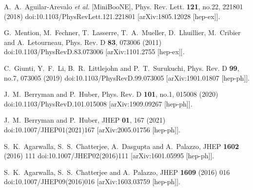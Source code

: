 \begin{thebibliography}{00}
A.~A.~Aguilar-Arevalo \textit{et al.} [MiniBooNE],
Phys. Rev. Lett. \textbf{121}, no.22, 221801 (2018)
doi:10.1103/PhysRevLett.121.221801
[arXiv:1805.12028 [hep-ex]].

G.~Mention, M.~Fechner, T.~Lasserre, T.~A.~Mueller, D.~Lhuillier, M.~Cribier and A.~Letourneau,
Phys. Rev. D \textbf{83}, 073006 (2011)
doi:10.1103/PhysRevD.83.073006
[arXiv:1101.2755 [hep-ex]].

C.~Giunti, Y.~F.~Li, B.~R.~Littlejohn and P.~T.~Surukuchi,
Phys. Rev. D \textbf{99}, no.7, 073005 (2019)
doi:10.1103/PhysRevD.99.073005
[arXiv:1901.01807 [hep-ph]].

J.~M.~Berryman and P.~Huber,
Phys. Rev. D \textbf{101}, no.1, 015008 (2020)
doi:10.1103/PhysRevD.101.015008
[arXiv:1909.09267 [hep-ph]].

J.~M.~Berryman and P.~Huber,
JHEP \textbf{01}, 167 (2021)
doi:10.1007/JHEP01(2021)167
[arXiv:2005.01756 [hep-ph]].



  S.~K.~Agarwalla, S.~S.~Chatterjee, A.~Dasgupta and A.~Palazzo,
  JHEP {\bf 1602} (2016) 111
  doi:10.1007/JHEP02(2016)111
  [arXiv:1601.05995 [hep-ph]].

  S.~K.~Agarwalla, S.~S.~Chatterjee and A.~Palazzo,
  JHEP {\bf 1609} (2016) 016
  doi:10.1007/JHEP09(2016)016
  [arXiv:1603.03759 [hep-ph]].




\end{thebibliography}
